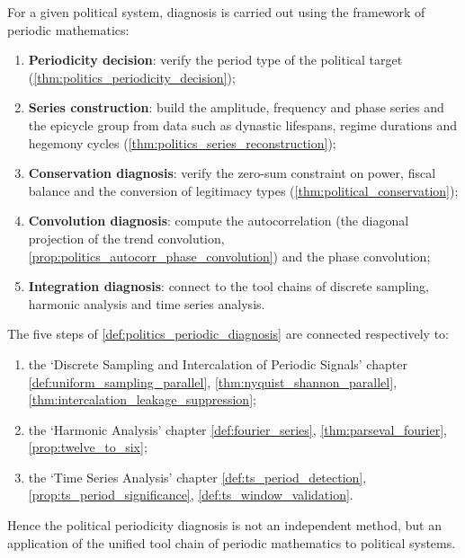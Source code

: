 \begin{definition}\label{def:politics_periodic_diagnosis}
For a given political system, diagnosis is carried out using the framework of periodic mathematics:
\begin{enumerate}[label=(\roman*)]
    \item \textbf{Periodicity decision}: verify the period type of the political target (\cref{thm:politics_periodicity_decision});
    \item \textbf{Series construction}: build the amplitude, frequency and phase series and the epicycle group from data such as dynastic lifespans, regime durations and hegemony cycles (\cref{thm:politics_series_reconstruction});
    \item \textbf{Conservation diagnosis}: verify the zero-sum constraint on power, fiscal balance and the conversion of legitimacy types (\cref{thm:political_conservation});
    \item \textbf{Convolution diagnosis}: compute the autocorrelation (the diagonal projection of the trend convolution, \cref{prop:politics_autocorr_phase_convolution}) and the phase convolution;
    \item \textbf{Integration diagnosis}: connect to the tool chains of discrete sampling, harmonic analysis and time series analysis.
\end{enumerate}
\end{definition}

\begin{theorem}\label{thm:politics_diagnosis_integration}
The five steps of \cref{def:politics_periodic_diagnosis} are connected respectively to:
\begin{enumerate}[label=(\roman*)]
    \item the `Discrete Sampling and Intercalation of Periodic Signals' chapter \cref{def:uniform_sampling_parallel}, \cref{thm:nyquist_shannon_parallel}, \cref{thm:intercalation_leakage_suppression};
    \item the `Harmonic Analysis' chapter \cref{def:fourier_series}, \cref{thm:parseval_fourier}, \cref{prop:twelve_to_six};
    \item the `Time Series Analysis' chapter \cref{def:ts_period_detection}, \cref{prop:ts_period_significance}, \cref{def:ts_window_validation}.
\end{enumerate}
Hence the political periodicity diagnosis is not an independent method, but an application of the unified tool chain of periodic mathematics to political systems.
\end{theorem}


